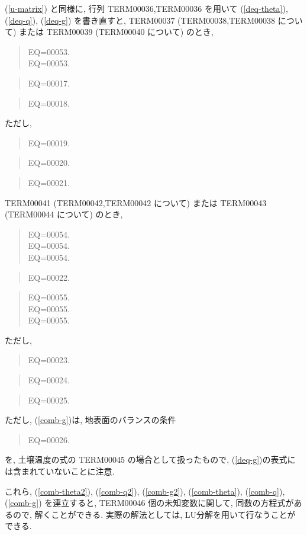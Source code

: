 (\ref{u-matrix}) と同様に, 行列 TERM00036,TERM00036 を用いて
(\ref{deq-theta}), (\ref{deq-q}), (\ref{deq-g}) を書き直すと, 
%
 TERM00037 (TERM00038,TERM00038 について) または TERM00039 (TERM00040 について) のとき, 
%
  \begin{quote}
\nonumber
EQ=00053.\\
\label{comb-theta2}
EQ=00053.
\end{quote}

\begin{quote}
EQ=00017.
\label{comb-q2}
\end{quote}

\begin{quote}
EQ=00018.
\label{comb-g2}
\end{quote}
%
ただし, 
\begin{quote}
EQ=00019.
\end{quote}
\begin{quote}
EQ=00020.
\end{quote}
\begin{quote}
EQ=00021.
\end{quote}

 TERM00041 (TERM00042,TERM00042 について) または TERM00043 (TERM00044 について) のとき, 
%
  \begin{quote}
\nonumber
EQ=00054.\\
\nonumber
EQ=00054.\\
\label{comb-theta}
EQ=00054.
\end{quote}
%
\begin{quote}
EQ=00022.
\label{comb-q}
\end{quote}
%
\begin{quote}
\nonumber
EQ=00055.\\
\nonumber
EQ=00055.\\
\label{comb-g}
EQ=00055.
\end{quote}
%
ただし, 
\begin{quote}
EQ=00023.
\end{quote}
\begin{quote}
EQ=00024.
\end{quote}
\begin{quote}
EQ=00025.
\end{quote}
%
ただし, (\ref{comb-g})は, 地表面のバランスの条件
\begin{quote}
EQ=00026.
\end{quote}
を, 土壌温度の式の TERM00045 の場合として扱ったもので, 
(\ref{deq-g})の表式には含まれていないことに注意. 

これら,
(\ref{comb-theta2}), (\ref{comb-q2}), (\ref{comb-g2}), 
(\ref{comb-theta}), (\ref{comb-q}), (\ref{comb-g})
を連立すると, TERM00046 個の未知変数に関して, 
同数の方程式があるので, 解くことができる.
実際の解法としては, LU分解を用いて行なうことができる.

